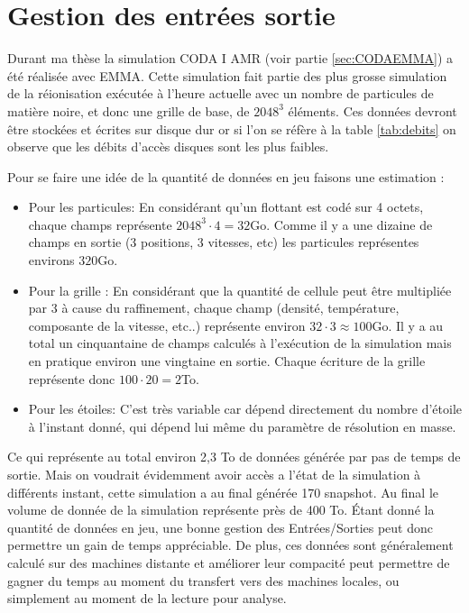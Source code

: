 \section{Gestion des entrées sortie}

Durant ma thèse la simulation CODA I AMR (voir partie \ref{sec:CODAEMMA}) a été réalisée avec EMMA.
Cette simulation fait partie des plus grosse simulation de la réionisation exécutée à l'heure actuelle avec un nombre de particules de matière noire, et donc une grille de base, de $2048^3$ éléments.
Ces données devront être stockées et écrites sur disque dur or si l'on se réfère à la table \ref{tab:debits} on observe que les débits d'accès disques sont les plus faibles.

Pour se faire une idée de la quantité de données en jeu faisons une estimation : 

\begin{itemize}
\item Pour les particules:
En considérant qu'un flottant est codé sur 4 octets, chaque champs représente $2048^3 \cdot 4 = 32$Go.
Comme il y a une dizaine de champs en sortie (3 positions, 3 vitesses, etc) les particules représentes environs $320$Go.

\item Pour la grille :
En considérant que la quantité de cellule peut être multipliée par 3 à cause du raffinement, chaque champ (densité, température, composante de la vitesse, etc..) représente environ $32 \cdot 3 \approx 100$Go.
Il y a au total un cinquantaine de champs calculés à l'exécution de la simulation mais en pratique environ une vingtaine en sortie.
Chaque écriture de la grille représente donc $100\cdot 20 =2$To.

\item Pour les étoiles:
C'est très variable car dépend directement du nombre d'étoile à l'instant donné, qui dépend lui même du paramètre de résolution en masse.
\end{itemize}

Ce qui représente au total environ 2,3 To de données générée par pas de temps de sortie.
Mais on voudrait évidemment avoir accès a l'état de la simulation à différents instant, cette simulation a au final générée 170 snapshot.
Au final le volume de donnée de la simulation représente près de 400 To.
Étant donné la quantité de données en jeu, une bonne gestion des Entrées/Sorties peut donc permettre un gain de temps appréciable.
De plus, ces données sont généralement calculé sur des machines distante et améliorer leur compacité peut permettre de gagner du temps au moment du transfert vers des machines locales, ou simplement au moment de la lecture pour analyse.

